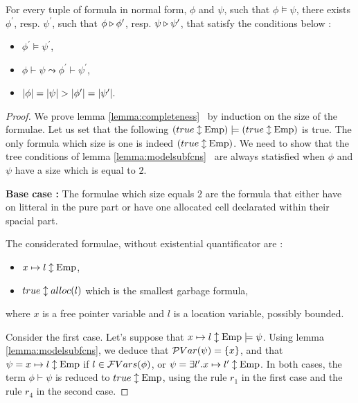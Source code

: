 \begin{lemma}
\label{lemma:completeness}
For every tuple of formula in normal form, $\phi$ and $\psi$, such that $\phi \models \psi$, there exists
$\phi^{\prime}$, resp. $\psi^{\prime}$, such that $\phi \triangleright \phi^{\prime}$, resp. $\psi \triangleright \psi^{\prime}$, that satisfy the conditions below :
\begin{itemize}
\item $\phi^{\prime} \models \psi^{\prime}$,
\item $\phi \vdash \psi \leadsto \phi^{\prime} \vdash \psi^{\prime}$,
\item $\sizef{\phi}=\sizef{\psi}>\sizef{\phi^{\prime}}=\sizef{\psi^{\prime}}.$
\end{itemize}
\end{lemma}

\begin{proof}

We prove lemma \ref{lemma:completeness}~ by induction on the size of the formulae.
Let us set that the following $(\Formula{\true}{\Emp}) \models (\Formula{\true}{\Emp})$ is
true.
The only formula which size is one is indeed $(\Formula{\true}{\Emp})$.
We need to show that the tree conditions of lemma \ref{lemma:modelsubfcns}~ are 
always statisfied when $\phi$ and $\psi$ have a size which is equal to $2$.

\textbf{Base case :}
The formulae which size equals $2$ are the formula that either have on litteral
in the pure part or have one allocated cell declarated within their spacial part.

The considerated formulae, without existential quantificator are :
\begin{itemize}
\item $\Formula{\Pointsto{x}{l}}{\Emp}$,
\item $true \updownarrow alloc(l)$ which is the smallest garbage formula,
\end{itemize}
where $x$ is a free pointer variable and $l$ is a location variable, possibly bounded.

Consider the first case. Let's suppose that $\Formula{\Pointsto{x}{l}}{\Emp}\models \psi$. Using lemma \ref{lemma:modelsubfcns}, we deduce that $\mathcal{P}Var(\psi)=\lbrace x\rbrace$, and that $\psi=\Formula{\Pointsto{x}{l}}{\Emp}$ if $l\in \mathcal{F}Vars(\phi)$, or
$\psi=\Formula{\exists l^{\prime}.\Pointsto{x}{l^{\prime}}}{\Emp}$.
In both cases, the term $\phi \vdash \psi$ is reduced to $\Formula{\true}{\Emp}$, using the rule $r_1$ in the first case and the rule $r_4$ in the second case.


\end{proof}

